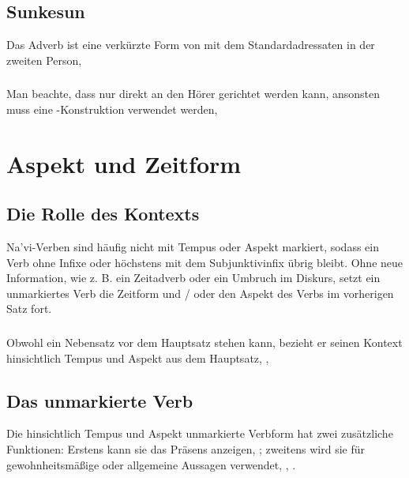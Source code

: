 \subsection{Sunkesun} Das Adverb   ist eine verkürzte Form von  mit dem Standardadressaten in der zweiten Person,  

\subsubsection{} Man beachte, dass  nur direkt an den Hörer gerichtet werden kann, ansonsten muss eine -Konstruktion verwendet werden,  


\section{Aspekt und Zeitform}

\subsection{Die Rolle des Kontexts} Na'vi-Verben sind häufig nicht mit Tempus oder Aspekt markiert, sodass ein Verb ohne Infixe oder höchstens mit dem Subjunktivinfix  übrig bleibt. Ohne neue Information, wie z. B. ein Zeitadverb oder ein Umbruch im Diskurs, setzt ein unmarkiertes Verb die Zeitform und / oder den Aspekt des Verbs im vorherigen Satz fort.

\subsubsection{} Obwohl ein Nebensatz vor dem Hauptsatz stehen kann, bezieht er seinen Kontext hinsichtlich Tempus und Aspekt aus dem Hauptsatz,  ,  

\subsection{Das unmarkierte Verb} Die hinsichtlich Tempus und Aspekt unmarkierte Verbform hat zwei zusätzliche Funktionen: Erstens kann sie das Präsens anzeigen,  ; zweitens wird sie für gewohnheitsmäßige oder allgemeine Aussagen verwendet,  ,  .

